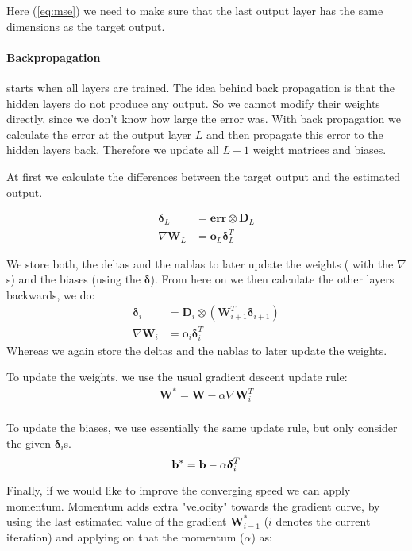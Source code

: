 Here (\ref{eq:mse}) we need to make sure that the last output layer has the same dimensions as the target output.


\paragraph{Backpropagation} starts when all layers are trained. The idea behind back propagation is that the hidden layers do not produce any output. So we cannot modify their weights directly, since we don’t know how large the error was. With back propagation we calculate the error at the output layer $L$ and then propagate this error to the hidden layers back. Therefore we update all $L-1$ weight matrices and biases.

At first we calculate the differences between the target output and the estimated output.

\begin{align}
\boldsymbol{\delta}_L &= \mathbf{err} \otimes \mathbf{D}_L\\
\nabla \mathbf{W}_L &= \mathbf{o}_L \boldsymbol{\delta}_L^T
\end{align}

We store both, the deltas and the nablas to later update the weights ( with the $\nabla$s) and the biases (using the $\mathbf{\delta}$).
From here on we then calculate the other layers backwards, we do:
\begin{align}
\boldsymbol{\delta}_i &= \mathbf{D}_i \otimes \left( \mathbf{W}_{i+1}^T \boldsymbol{\delta}_{i+1} \right)\\
\nabla \mathbf{W}_i &= \mathbf{o}_i \boldsymbol{\delta}_i^T
\end{align}
Whereas we again store the deltas and the nablas to later update the weights.

To update the weights, we use the usual gradient descent update rule:
\begin{align}
\mathbf{W}^{*} = \mathbf{W} - \alpha \nabla \mathbf{W}_i^T\\
\end{align}

To update the biases, we use essentially the same update rule, but only consider the given $\boldsymbol{\delta}_{i}$s.
\begin{equation}
\mathbf{b}^{*} = \mathbf{b} - \alpha \boldsymbol{\delta}_i^T\\
\end{equation}

Finally, if we would like to improve the converging speed we can apply momentum. Momentum adds extra "velocity" towards the gradient curve, by using the last estimated value of the gradient $\mathbf{W}^{*}_{i-1}$ ($i$ denotes the current iteration) and applying on that the momentum ($ \alpha$) as:

